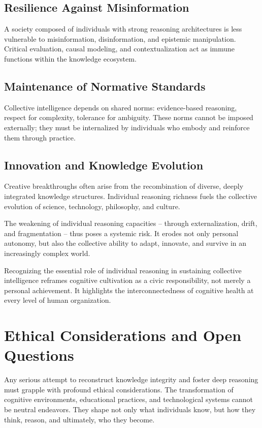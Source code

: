 \subsection{Resilience Against Misinformation}

A society composed of individuals with strong reasoning architectures is
less vulnerable to misinformation, disinformation, and epistemic
manipulation. Critical evaluation, causal modeling, and
contextualization act as immune functions within the knowledge
ecosystem.

\subsection{Maintenance of Normative Standards}

Collective intelligence depends on shared norms: evidence-based
reasoning, respect for complexity, tolerance for ambiguity. These norms
cannot be imposed externally; they must be internalized by individuals
who embody and reinforce them through practice.

\subsection{Innovation and Knowledge Evolution}

Creative breakthroughs often arise from the recombination of diverse,
deeply integrated knowledge structures. Individual reasoning richness
fuels the collective evolution of science, technology, philosophy, and
culture.

The weakening of individual reasoning capacities -- through
externalization, drift, and fragmentation -- thus poses a systemic risk.
It erodes not only personal autonomy, but also the collective ability to
adapt, innovate, and survive in an increasingly complex world.

Recognizing the essential role of individual reasoning in sustaining
collective intelligence reframes cognitive cultivation as a civic
responsibility, not merely a personal achievement. It highlights the
interconnectedness of cognitive health at every level of human
organization.


\section{Ethical Considerations and Open Questions}

Any serious attempt to reconstruct knowledge integrity and foster deep
reasoning must grapple with profound ethical considerations. The
transformation of cognitive environments, educational practices, and
technological systems cannot be neutral endeavors. They shape not only
what individuals know, but how they think, reason, and ultimately, who
they become.

